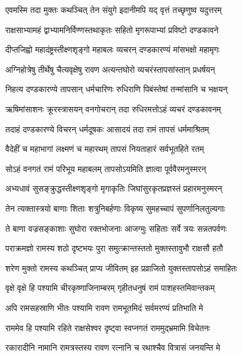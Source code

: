 
\twolineshloka
{एवमस्मि तदा मुक्तः कथञ्चित् तेन संयुगे}
{इदानीमपि यद् वृत्तं तच्छृणुष्व यदुत्तरम्} %

\twolineshloka
{राक्षसाभ्यामहं द्वाभ्यामनिर्विण्णस्तथाकृतः}
{सहितो मृगरूपाभ्यां प्रविष्टो दण्डकावने} %

\twolineshloka
{दीप्तजिह्वो महादंष्ट्रस्तीक्ष्णशृङ्गो महाबलः}
{व्यचरन् दण्डकारण्यं मांसभक्षो महामृगः} %

\twolineshloka
{अग्निहोत्रेषु तीर्थेषु चैत्यवृक्षेषु रावण}
{अत्यन्तघोरो व्यचरंस्तापसांस्तान् प्रधर्षयन्} %

\twolineshloka
{निहत्य दण्डकारण्ये तापसान् धर्मचारिणः}
{रुधिराणि पिबंस्तेषां तन्मांसानि च भक्षयन्} %

\twolineshloka
{ऋषिमांसाशनः क्रूरस्त्रासयन् वनगोचरान्}
{तदा रुधिरमत्तोऽहं व्यचरं दण्डकावनम्} %

\twolineshloka
{तदाहं दण्डकारण्ये विचरन् धर्मदूषकः}
{आसादयं तदा रामं तापसं धर्ममाश्रितम्} %

\twolineshloka
{वैदेहीं च महाभागां लक्ष्मणं च महारथम्}
{तापसं नियताहारं सर्वभूतहिते रतम्} %

\twolineshloka
{सोऽहं वनगतं रामं परिभूय महाबलम्}
{तापसोऽयमिति ज्ञात्वा पूर्ववैरमनुस्मरन्} %

\twolineshloka
{अभ्यधावं सुसङ्क्रुद्धस्तीक्ष्णशृङ्गो मृगाकृतिः}
{जिघांसुरकृतप्रज्ञस्तं प्रहारमनुस्मरन्} %

\twolineshloka
{तेन त्यक्तास्त्रयो बाणाः शिताः शत्रुनिबर्हणाः}
{विकृष्य सुमहच्चापं सुपर्णानिलतुल्यगाः} %

\twolineshloka
{ते बाणा वज्रसङ्काशाः सुघोरा रक्तभोजनाः}
{आजग्मुः सहिताः सर्वे त्रयः सन्नतपर्वणः} %

\twolineshloka
{पराक्रमज्ञो रामस्य शठो दृष्टभयः पुरा}
{समुत्क्रान्तस्ततो मुक्तस्तावुभौ राक्षसौ हतौ} %

\twolineshloka
{शरेण मुक्तो रामस्य कथञ्चित् प्राप्य जीवितम्}
{इह प्रव्राजितो युक्तस्तापसोऽहं समाहितः} %

\twolineshloka
{वृक्षे वृक्षे हि पश्यामि चीरकृष्णाजिनाम्बरम्}
{गृहीतधनुषं रामं पाशहस्तमिवान्तकम्} %

\twolineshloka
{अपि रामसहस्राणि भीतः पश्यामि रावण}
{रामभूतमिदं सर्वमरण्यं प्रतिभाति मे} %

\twolineshloka
{राममेव हि पश्यामि रहिते राक्षसेश्वर}
{दृष्ट्वा स्वप्नगतं राममुद्भ्रमामि विचेतनः} %

\twolineshloka
{रकारादीनि नामानि रामत्रस्तस्य रावण}
{रत्नानि च रथाश्चैव वित्रासं जनयन्ति मे} %

